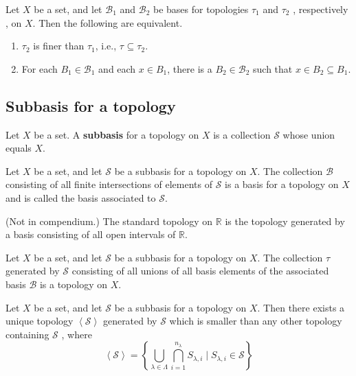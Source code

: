 \documentclass{article}
\theoremstyle{remark}
\begin{document}
\begin{theorem}
Let $X$ be a set, and let  $ \mathscr{B} _{1} $ and $\mathscr{B} _{2}$ be bases for topologies $\tau _{1}$ and $\tau
_{2}$ , respectively , on $X$. Then the following are equivalent.
\begin{enumerate}[label=(\roman*)]
    \item $\tau _{2}$ is finer than $\tau _{1}$, i.e., $\tau _{} \subseteq  \tau _{2}$.
    \item For each $B_{1} \in \mathscr{B} _{1}$ and each $x \in B_{1}$, there is a $B_{2} \in \mathscr{B} _{2}$ such
        that $x \in  B_{2} \subseteq B_{1}$.
\end{enumerate}
\end{theorem}

\subsection{Subbasis for a topology}%
\label{sub:subbasis_for_a_topology}

\begin{definition}[Subbasis]

    Let $X$ be a set. A \textbf{subbasis } for a topology on $X$ is a collection $ \mathscr{S} $ whose union equals $X$.
\end{definition}

\begin{lemma}
Let $X$ be a set, and let $ \mathscr{S} $ be a subbasis for a topology on $X$. The collection $ \mathscr{B} $
consisting of all finite intersections of elements of $\mathscr{S} $ is a basis for a topology on $X$ and is called the
basis associated to $ \mathscr{S} $.
\end{lemma}


\begin{definition}
    (Not in compendium.)
    The standard topology on $ \mathbb{R} $ is the topology generated by a basis consisting of all open intervals of $
    \mathbb{R} $.
\end{definition}

\begin{lemma}
Let $X$ be a set, and let $\mathscr{S} $ be a subbasis for a topology on $X$. The collection $\tau $ generated by $
\mathscr{S} $ consisting of all unions of all basis elements of the associated basis $\mathscr{B} $ is a topology on
$X$.
\end{lemma}

\begin{theorem}
    Let $X$ be a set, and let $ \mathscr{S} $ be a subbasis for a topology on $X$. Then there exists a unique topology
    $\left<\mathscr{S}  \right>$ generated by $ \mathscr{S} $ which is smaller than any other topology containing
    $\mathscr{S} $ , where \[
    \left<\mathscr{S}  \right> = \left\{ \bigcup_{\lambda  \in  \Lambda }^{} \bigcap_{i=1}^{n_{\lambda }} S_{\lambda
    ,i}  \mid  S_{\lambda ,i} \in  \mathscr{S}     \right\}
    \]
\end{theorem}
\end{document}
